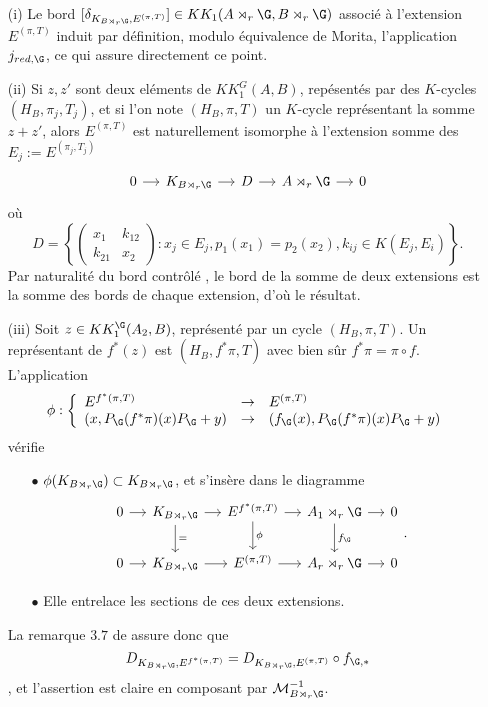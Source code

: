 \begin{dem}
\begin{enumerate}

\item[(i)] Le bord $[\delta_{K_{B\rtimes_r \G},E^{(\pi,T)}}]\in KK_1(A\rtimes_r \G, B\rtimes_r \G)$ associé à l'extension $E^{(\pi,T)}$ induit par définition, modulo équivalence de Morita, l'application $j_{red,\G}$, ce qui assure directement ce point.

\item[(ii)] Si $z,z'$ sont deux eléments de $KK_1^G(A,B)$, repésentés par des $K$-cycles $(H_B,\pi_j,T_j)$, et si l'on note $(H_B,\pi,T)$ un $K$-cycle représentant la somme $z+z'$, alors $E^{(\pi,T)}$ est naturellement isomorphe à l'extension somme des $E_j:=E^{(\pi_j,T_j)}$
\[\begin{tikzcd}[column sep = small]
0\arrow{r} & K_{B\rtimes_r \G} \arrow{r} & D \arrow{r} & A\rtimes_r \G \arrow{r} & 0
\end{tikzcd}\]
où 
\[D=\left\{\begin{pmatrix}x_1 & k_{12}\\ k_{21} & x_2\end{pmatrix} : x_j\in E_j , p_1(x_1)=p_2(x_2), k_{ij}\in K(E_j,E_i)\right\}.\]
Par naturalité du bord contrôlé \cite{OY2}, le bord de la somme de deux extensions est la somme des bords de chaque extension, d'où le résultat.
\item[(iii)] Soit $z\in KK_1^\G(A_2,B)$, représenté par un cycle $(H_B,\pi,T)$. Un représentant de $f^*(z)$ est $(H_B,f^*\pi,T)$ avec bien sûr $f^*\pi=\pi \circ f$. L'application 
\[\phi : \left\{\begin{array}{lll} E^{f^*(\pi,T)} & \rightarrow & E^{(\pi,T)} \\
( x, P_\G(f^*\pi)(x)P_\G+y) & \rightarrow & ( f_\G(x), P_\G(f^*\pi)(x)P_\G+y) \end{array}\right. \]
vérifie
\begin{enumerate}
\item[$\bullet$] $\phi(K_{B\rtimes_r \G})\subset K_{B\rtimes_r \G}$, et s'insère dans le diagramme
\[\begin{tikzcd}[column sep = small]
0\arrow{r} & K_{B\rtimes_r \G}\arrow{r}\arrow{d}{=} & E^{f^*(\pi,T)} \arrow{r}\arrow{d}{\phi}& A_1\rtimes_r \G\arrow{r}\arrow{d}{f_\G} & 0\\
0\arrow{r} & K_{B\rtimes_r \G}\arrow{r} & E^{(\pi,T)} \arrow{r}& A_r\rtimes_r \G\arrow{r} & 0
\end{tikzcd}.\]
\item[$\bullet$] Elle entrelace les sections de ces deux extensions.
\end{enumerate}
La remarque $3.7$ de \cite{OY2} assure donc que \[D_{K_{B\rtimes_r \G}, E^{f^*(\pi,T)} } =  D_{K_{B\rtimes_r \G}, E^{(\pi,T)} }\circ f_{\G,*}\], et l'assertion est claire en composant par $\mathcal M_{B\rtimes_r \G}^{-1}$.
\end{enumerate}
\end{dem}

